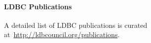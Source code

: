 

\paragraph*{LDBC Publications}

A detailed list of LDBC publications is curated at~\url{http://ldbcouncil.org/publications}.